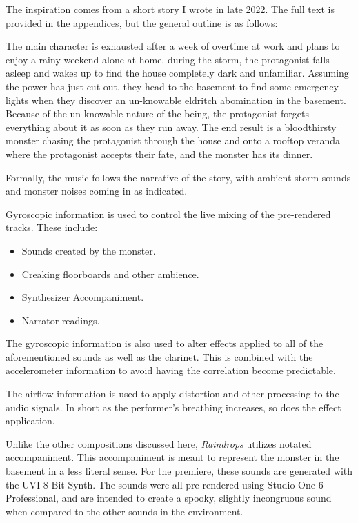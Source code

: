The inspiration comes from a short story I wrote in late 2022. The full text is provided in the appendices, but the general outline is as follows:

The main character is exhausted after a week of overtime at work and plans to enjoy a rainy weekend alone at home. during the storm, the protagonist falls asleep and wakes up to find the house completely dark and unfamiliar. Assuming the power has just cut out, they head to the basement to find some emergency lights when they discover an un-knowable eldritch abomination in the basement. Because of the un-knowable nature of the being, the protagonist forgets everything about it as soon as they run away. The end result is a bloodthirsty monster chasing the protagonist through the house and onto a rooftop veranda where the protagonist accepts their fate, and the monster has its dinner.

Formally, the music follows the narrative of the story, with ambient storm sounds and monster noises coming in as indicated. 

Gyroscopic information is used to control the live mixing of the pre-rendered tracks. These include:
\begin{itemize}
    \item Sounds created by the monster.
    \item Creaking floorboards and other ambience.
    \item Synthesizer Accompaniment.
    \item Narrator readings.
\end{itemize}

The gyroscopic information is also used to alter effects applied to all of the aforementioned sounds as well as the clarinet. This is combined with the accelerometer information to avoid having the correlation become predictable.

The airflow information is used to apply distortion and other processing to the audio signals. In short as the performer's breathing increases, so does the effect application.

Unlike the other compositions discussed here, \textit{Raindrops} utilizes notated accompaniment. This accompaniment is meant to represent the monster in the basement in a less literal sense. For the premiere, these sounds are generated with the UVI 8-Bit Synth. The sounds were all pre-rendered using Studio One 6 Professional, and are intended to create a spooky, slightly incongruous sound when compared to the other sounds in the environment. 

